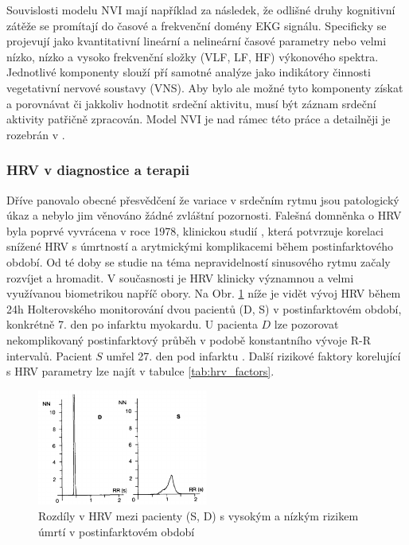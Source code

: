Souvislosti modelu NVI mají například za následek, že odlišné druhy kognitivní
zátěže se promítají do časové a frekvenční domény EKG signálu. Specificky se
projevují jako kvantitativní lineární a nelineární časové parametry nebo velmi
nízko, nízko a vysoko frekvenční složky (VLF, LF, HF) výkonového spektra.
Jednotlivé komponenty slouží pří samotné analýze jako indikátory činnosti
vegetativní nervové soustavy (VNS). Aby bylo ale možné tyto komponenty získat a
porovnávat či jakkoliv hodnotit srdeční aktivitu, musí být záznam srdeční
aktivity patřičně zpracován. Model NVI je nad rámec této práce a detailněji je
rozebrán v \cite{Smith2017}.

\subsubsection{HRV v diagnostice a terapii}
Dříve panovalo obecné přesvědčení že variace v srdečním rytmu jsou patologický
úkaz a nebylo jim věnováno žádné zvláštní pozornosti. Falešná domněnka o HRV
byla poprvé vyvrácena v roce 1978, klinickou studií \cite{Wolf1978}, která
potvrzuje korelaci snížené HRV s úmrtností a arytmickými komplikacemi během
postinfarktového období. Od té doby se studie na téma nepravidelností sinusového
rytmu začaly rozvíjet a hromadit. V současnosti je HRV klinicky významnou a
velmi využívanou biometrikou napříč obory. Na Obr. \ref{fig:hrv_infarct} níže je
vidět vývoj HRV během 24h Holterovského monitorování dvou pacientů (D, S) v
postinfarktovém období, konkrétně 7. den po infarktu myokardu. U pacienta $D$
lze pozorovat nekomplikovaný postinfarktový průběh v podobě konstantního vývoje
R-R intervalů. Pacient $S$ umřel 27. den pod infarktu \cite{Malik1990}. Další
rizikové faktory korelující s HRV parametry lze najít v tabulce
\ref{tab:hrv_factors}.

\begin{figure}[h]
	\begin{center}
		\includegraphics[width=0.5\textwidth]{../assets/figures/hrv_infarct}
		\caption{Rozdíly v HRV mezi pacienty (S, D) s vysokým a nízkým rizikem úmrtí v
			postinfarktovém období \cite{Malik1990}}
		\label{fig:hrv_infarct}
	\end{center}
\end{figure}

